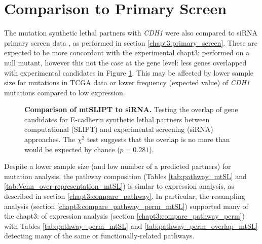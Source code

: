 \clearpage
\section{Comparison to Primary Screen}

The mutation synthetic lethal partners with \textit{CDH1} were also compared to siRNA primary screen data \citep{Telford2015}, as performed in section \ref{chapt3:primary_screen}. These are expected to be more concordant with the experimental chapt3: performed on a null mutant, however this not the case at the gene level: less genes overlapped with experimental candidates in Figure \ref{fig:Venn_allgenes_mtSL}. This may be affected by lower sample size for mutations in TCGA data or lower frequency (expected value) of \textit{CDH1} mutations compared to low expression. 

\begin{figure}[!ht]
\begin{mdframed}
  \centering
    \caption[Comparison of mtSLIPT to siRNA]{\small \textbf{Comparison of mtSLIPT to siRNA.} Testing the overlap of gene candidates for E-cadherin synthetic lethal partners between computational (SLIPT) and experimental screening (siRNA) approaches. The $\chi^2$ test suggests that the overlap is no more than would be expected by chance ($p = 0.281$). %
}
\label{fig:Venn_allgenes_mtSL}
\end{mdframed}
\end{figure}

\FloatBarrier

Despite a lower sample size (and low number of a predicted partners) for mutation analysis, the pathway composition (Tables \ref{tab:pathway_mtSL} and \ref{tab:Venn_over-representation_mtSL}) is simlar to expression analysis, as described in section \ref{chapt3:compare_pathway}. In particular, the resampling analysis (section \ref{chapt3:compare_pathway_perm_mtSL}) supported many of the chapt3: of expression analysis (section \ref{chapt3:compare_pathway_perm}) with Tables \ref{tab:pathway_perm_mtSL} and \ref{tab:pathway_perm_overlap_mtSL} detecting many of the same or functionally-related pathways.
 

